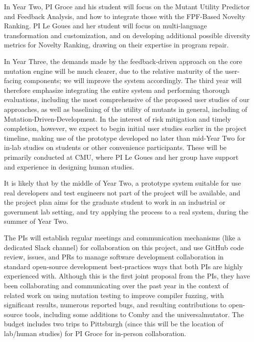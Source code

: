 \documentclass[11pt]{article}
\begin{document}
In Year Two, PI Groce and his student will focus on the Mutant Utility Predictor
and Feedback Analysis, and how to integrate those with the FPF-Based Novelty
Ranking.  PI Le Goues and her student will focus on multi-language
transformation and customization, and on developing additional possible
diversity metrics for Novelty Ranking, drawing on their expertise in program
repair.

In Year Three, the demands made by the feedback-driven approach on the core
mutation engine will be much clearer, due to the relative maturity of the
user-facing components; we will improve the system accordingly.  The third year
will therefore emphasize integrating the entire system and performing thorough
evaluations, including the most comprehensive of the proposed user
studies of our approaches, as well as baselining of the utility of mutants in
general, including of Mutation-Driven-Development.
In the interest of risk mitigation and timely completion, however, we expect to
begin initial user studies earlier in the project timeline, making use of the
prototype developed no later than mid-Year Two for in-lab studies on students or
other convenience participants.  These will be primarily conducted at CMU, where
PI Le Goues and her group have support and experience in designing human
studies. 

It is likely that
by the middle of Year Two, a prototype system suitable for use real
developers and test engineers not part of the project will be available, and the
project plan aims for the graduate student to work in an industrial or
government lab setting, and try applying the process to a real system, during
the summer of Year Two.

The PIs will establish regular meetings and communication mechanisms (like a
dedicated Slack channel) for collaboration on this project, and use
GitHub code review, issues, and PRs to manage software development
collaboration in standard open-source development best-practices ways that both
PIs are highly experienced with.  Although this is the first joint
proposal from the PIs, they have been collaborating and communicating
over the past year in the context of related work on using mutation
testing to improve compiler fuzzing, with significant results,
numerous reported bugs, and
resulting contributions to open-source tools, including some additions
to Comby and the universalmutator.  The budget includes two trips to
Pittsburgh (since this will be the location of lab/human studies) for
PI Groce for in-person collaboration.
\end{document}
